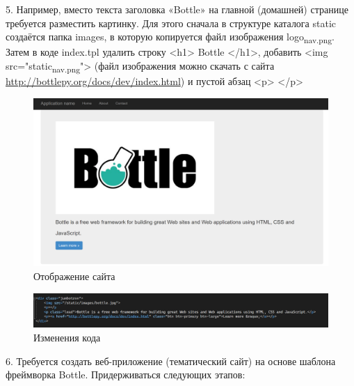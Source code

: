 \documentclass[14pt]{extarticle}
\begin{document}
​​​5. Например, вместо текста заголовка «Bottle» на главной (домашней) странице требуется разместить картинку.
   Для этого сначала в структуре каталога static создаётся папка images, в которую копируется файл изображения logo\textsubscript{nav.png}.
   Затем в коде index.tpl удалить строку <h1> Bottle </h1>, добавить <img src="static\images\logo\textsubscript{nav.png}">
   (файл изображения можно скачать с сайта \url{http://bottlepy.org/docs/dev/index.html}) и пустой абзац <p> </p>

\begin{figure}[H]
\centering
\includegraphics[width=.9\linewidth]{images/20230323-122110_screenshot.png}
\caption{Отображение сайта}
\end{figure}

\begin{figure}[H]
\centering
\includegraphics[width=.9\linewidth]{images/20230323-122156_screenshot.png}
\caption{Изменения кода}
\end{figure}


​6. Требуется создать веб-приложение (тематический сайт) на основе шаблона фреймворка Bottle. Придерживаться следующих этапов:  
\end{document}
